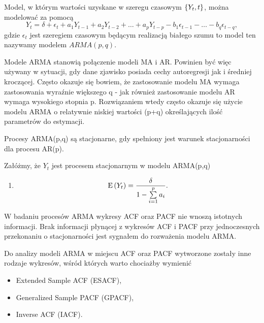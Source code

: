 \documentclass[10pt,a4paper]{book}
\begin{document}
\begin{definition}

Model, w którym wartości uzyskane w szeregu czasowym $\left\lbrace {{Y_t}, {t}} \right\rbrace$, można modelować za pomocą
$$
Y_t = \delta + \epsilon_t + a_1 Y_{t-1} + a_2 Y_{t-2} + \ldots + a_p Y_{t-p} - b_1 \epsilon_{t-1} -\ldots - b_q \epsilon_{t-q} ,
$$
gdzie $\epsilon_t $ jest szeregiem czasowym będącym realizacją białego szumu to model ten nazywamy modelem  $ARMA(p,q)$.
\end{definition}

\begin{remark}
Modele ARMA stanowią połączenie modeli MA i AR. Powinien być więc używany w sytuacji, gdy dane zjawisko posiada cechy autoregresji jak i średniej kroczącej. Często okazuje się bowiem, że zastosowanie modelu MA wymaga zastosowania wyraźnie większego q - jak również zastosowanie modelu AR wymaga wysokiego stopnia p. Rozwiązaniem wtedy często okazuje się użycie modelu ARMA o relatywnie niskiej wartości (p+q) określających ilość parametrów do estymacji.
\end{remark}

\begin{remark}
Procesy ARMA(p,q) są stacjonarne, gdy spełniony jest warunek stacjonarności dla procesu AR(p).
\end{remark}

\begin{proposition}
Załóżmy, że $Y_t$ jest procesem stacjonarnym w modelu ARMA(p,q)
\begin{enumerate}
\item 
$$
\Ex{Y_t} = \frac{\delta}{1	- \sum_{i=1}^{p} a_i}.
$$
\end{enumerate}
\end{proposition}

\begin{remark}
W badaniu procesów ARMA wykresy ACF oraz PACF nie wnoszą istotnych informacji. Brak informacji płynącej z wykresów ACF i PACF przy jednoczesnych przekonaniu o stacjonarności jest sygnałem do rozważenia modelu ARMA.
\end{remark}

Do analizy modeli ARMA w miejscu ACF oraz PACF wytworzone zostały inne rodzaje wykresów, wśród których warto chociażby wymienić

\begin{itemize}
\item Extended Sample ACF (ESACF), 
\item Generalized Sample PACF (GPACF),
\item Inverse ACF (IACF).
\end{itemize}
\end{document}
